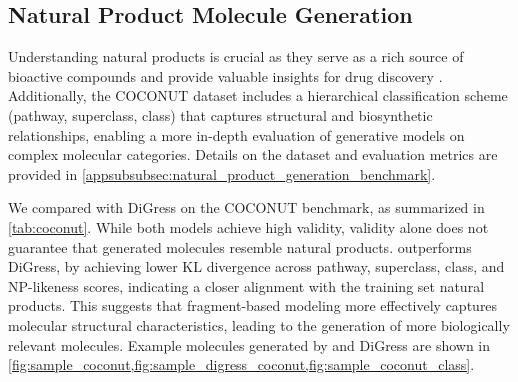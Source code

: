 \subsection{Natural Product Molecule Generation}
\label{sec:natural_product_molecule_generation}



Understanding natural products is crucial as they serve as a rich source of bioactive compounds and provide valuable insights for drug discovery \citep{np_in_drug_discovery, np_source_new_drug}.  
Additionally, the COCONUT dataset includes a hierarchical classification scheme (pathway, superclass, class) that captures structural and biosynthetic relationships, enabling a more in-depth evaluation of generative models on complex molecular categories.
Details on the dataset and evaluation metrics are provided in \cref{appsubsubsec:natural_product_generation_benchmark}.

We compared \methodname{} with DiGress on the COCONUT benchmark, as summarized in \cref{tab:coconut}.
While both models achieve high validity, validity alone does not guarantee that generated molecules resemble natural products.  
\methodname{} outperforms DiGress, by achieving lower KL divergence across pathway, superclass, class, and NP-likeness scores, indicating a closer alignment with the training set natural products. 
This suggests that fragment-based modeling more effectively captures molecular structural characteristics, leading to the generation of more biologically relevant molecules. 
Example molecules generated by \methodname{} and DiGress are shown in \cref{fig:sample_coconut,fig:sample_digress_coconut,fig:sample_coconut_class}.


